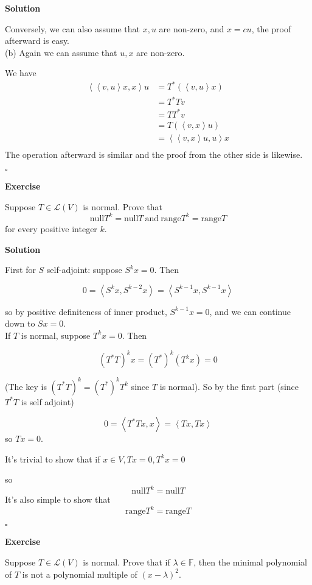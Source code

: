 \documentclass{article}
\newenvironment{exercise}{%
{\textbf{Exercise\\}
    }
}{
}
\newenvironment{solution}{%
{
    \textbf{Solution\\}
    }
}{
  \hfill $\square$ 
  \par\bigskip 
}
\newcommand{\FF}{\mathbb{F}}
\newcommand{\parameter}[1]{\left(#1\right)}
\newcommand{\range}{\text{range}}
\newcommand{\n}{\text{null}}
\begin{document}
\begin{CJK}{UTF8}{gkai}
\begin{solution}
    Conversely, we can also assume that $x,u$ are non-zero, and $x = cu$, the proof afterward is easy.\\

    (b) Again we can assume that $u,x$ are non-zero.

    We have
    \[\begin{aligned}
        \left<\left<v,u\right> x,x\right> u &= T^\ast \parameter{\left<v,u\right> x}\\
        &= T^\ast T v\\
        &= T T^\ast v\\
        &= T \parameter{\left<v,x\right> u}\\
        &= \left<\left<v,x\right> u,u\right> x\\
    \end{aligned}
        \]
        The operation afterward is similar and the proof from the other side is likewise.
\end{solution}

\begin{exercise}
    Suppose $T \in \mathcal{L}(V)$ is normal. Prove that
    \[\n T^k = \n T ~\text{and}~ \range T^k = \range T\]
    for every positive integer $k$.
\end{exercise}

\begin{solution}
    First for $S$ self-adjoint: suppose $S^k x=0$. Then
   
    \[0=\left<S^k x,S^{k-2}x\right>=\left<S^{k-1}x,S^{k-1}x\right>\]
   
    so by positive definiteness of inner product, $S^{k-1}x=0$, and we can continue down to $Sx=0$.\\

    If $T$ is normal, suppose $T^kx=0$. Then
   
    \[(T^\ast T)^k x=(T^\ast )^k(T^k x) = 0\]
   
    (The key is $(T^\ast T)^k = (T^\ast )^k T^k$ since $T$ is normal). So by the first part (since $T^\ast T$ is self adjoint)
   
    \[0=\left<T^\ast Tx,x\right>=\left<Tx,Tx\right>\]
    so $Tx=0$.

    It's trivial to show that if $x \in V , Tx = 0, T^k x = 0$
   
    so
    \[\n T^k = \n T\]
    It's also simple to show that 
    \[\range T^k = \range T\]
\end{solution}

\begin{exercise}
    Suppose $T \in \mathcal{L}(V)$ is normal. Prove that if $\lambda \in \FF$, then the minimal polynomial of $T$ is not a polynomial multiple of $(x - \lambda)^2$.


\end{exercise}
\end{CJK}
\end{document}
